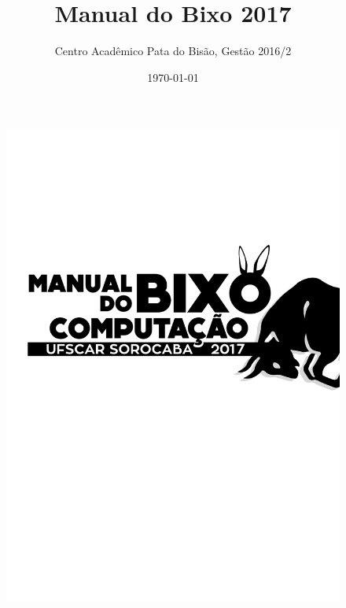 \documentclass[12pt]{article}
\title{Manual do Bixo 2017}
\author{Centro Acadêmico Pata do Bisão, Gestão 2016/2}
\date{\today}
\begin{document}
\begin{figure}
    \hspace*{-3.7cm}\includegraphics{./imagem/capa2017.pdf}
\end{figure}
\thispagestyle{empty}

\clearpage

\thispagestyle{empty}

\clearpage
\setcounter{page}{1}

\clearpage
\tableofcontents

\clearpage


\clearpage











\clearpage

\thispagestyle{empty}
\end{document}
